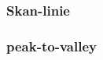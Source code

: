 \begin{comment}
\begin{itemize}
\item[-] Hvert tegn fylder maksimalt 1/7 del af billedet.
\item[-] Hvert tegn har en maksimal bredde på 1/7 af billedets bredde.
\item[-] Tegnenes højde er større end deres bredde
\item[-] Tegnenes minimale højde skal være end en vis konstant (her: 5 pixels)
\item[-] Tegnenes minimale størrelse skal være større end en vis konstant (her: 5 pixels)
\end{itemize}

EKSEMPEL PÅ BILLEDE HVOR IKKE-TEGN KOMPONENTER ER SORTERET FRA

Til sidst udklippes de syv tegn og returneres. Eksempel på en fuldendt og succesfuld segmentering er vist i Figur ?.

EKSEMPEL PÅ UDKLIPPEDE TEGN

Som beskrevet i kwasnickawawrzyniak kunne man eventuelt fjerne kanter før man starter analysen?
\end{comment}

\subsubsection*{Skan-linie}
\begin{comment}
Bruges ikke da det er for mange felter som bliver valgt. Kan måske gøres bedre ved filtrering før???

Først gøres billedet sort-hvis med im2bw. Her kan grænseværdi bestemmes med greythresh. Virker måske bedre at sætte grænseværdien lavt, så meget af billedet bliver hvidt.

Billedet skal skæres foroven og forneden. Dette gøres simpelt ved at finde den største pixl-sum i toppen af billedet og den største sum i bunden. Det antages så at disse max-summer er dele af nummerpladerne hvor teksten ikke er startet.

Step igennem vertikale linier: hvad sker før tegn, i et tegn, i slutningen af et tegn og efter et tegn.
\end{comment}

\subsubsection*{peak-to-valley}
\begin{comment}
Beskrevet i kwasnickawawrzyniak og bør måske afprøves? Måske i samarbejde med første metode?
\end{comment}

